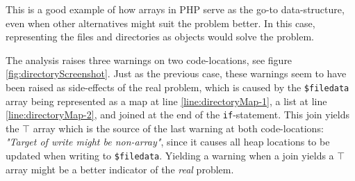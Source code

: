 This is a good example of how arrays in PHP serve as the go-to data-structure, even when other alternatives might suit the problem better. In this case, representing the files and directories as objects would solve the problem.


The analysis raises three warnings on two code-locations, see figure \ref{fig:directoryScreenshot}. Just as the previous case, these warnings seem to have been raised as side-effects of the real problem, which is caused by the \texttt{\$filedata} array being represented as a map at line \ref{line:directoryMap-1}, a list at line \ref{line:directoryMap-2}, and joined at the end of the \texttt{if}-statement. This join yields the $\top$ array which is the source of the last warning at both code-locations: \textit{"Target of write might be non-array"}, since it causes all heap locations to be updated when writing to \texttt{\$filedata}. Yielding a warning when a join yields a $\top$ array might be a better indicator of the \textit{real} problem.

